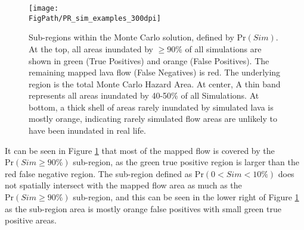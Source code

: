 		\begin{figure}[!h]
			\centering
			\texttt{[image: \\FigPath/PR\_sim\_examples\_300dpi]}
			\caption[Sub-regions within the Monte Carlo solution, defined by $\text{Pr}(Sim)$]{Sub-regions within the Monte Carlo solution, defined by $\text{Pr}(Sim)$. At the top, all areas inundated by $\ge$90\% of all simulations are shown in green (True Positives) and orange (False Positives). The remaining mapped lava flow (False Negatives) is red. The underlying region is the total Monte Carlo Hazard Area. At center, A thin band represents all areas inundated by 40-50\% of all Simulations. At bottom, a thick shell of areas rarely inundated by simulated lava is mostly orange, indicating rarely simulated flow areas are unlikely to have been inundated in real life.}
			\label{fig_MCsubregions}
		\end{figure}	
		
		It can be seen in Figure \ref{fig_MCsubregions} that most of the mapped flow is covered by the $\text{Pr}(Sim\ge90\%)$ sub-region, as the green true positive region is larger than the red false negative region. The sub-region defined as $\text{Pr}(0<Sim<10\%)$ does not spatially intersect with the mapped flow area as much as the $\text{Pr}(Sim\ge90\%)$ sub-region, and this can be seen in the lower right of Figure \ref{fig_MCsubregions} as the sub-region area is mostly orange false positives with small green true positive areas.
		
